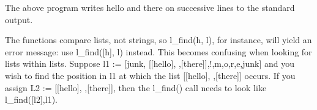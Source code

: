 
The above program writes {\textquotedbl}hello{\textquotedbl} and
{\textquotedbl}there{\textquotedbl} on successive lines to the standard
output.

The functions compare lists, not strings, so
\textsf{l\_find({\textquotedbl}h{\textquotedbl}, l)}, for instance,
will yield an error message: use
\textsf{l\_find([{\textquotedbl}h{\textquotedbl}], l)} instead. This
becomes confusing when looking for lists within lists. Suppose
\textsf{l1 := [{\textquotedbl}junk{\textquotedbl},
[[{\textquotedbl}hello{\textquotedbl}],{\textquotedbl}
{\textquotedbl},[{\textquotedbl}there{\textquotedbl}]],{\textquotedbl}!{\textquotedbl},{\textquotedbl}m{\textquotedbl},{\textquotedbl}o{\textquotedbl},{\textquotedbl}r{\textquotedbl},{\textquotedbl}e{\textquotedbl},{\textquotedbl}junk{\textquotedbl}]}
and you wish to find the position in \textsf{l1} at which the list
\textsf{[[{\textquotedbl}hello{\textquotedbl}],{\textquotedbl}
{\textquotedbl},[{\textquotedbl}there{\textquotedbl}]]} occurs. If you
assign \textsf{L2 :=
[[{\textquotedbl}hello{\textquotedbl}],{\textquotedbl}
{\textquotedbl},[{\textquotedbl}there{\textquotedbl}]]}, then the
\textsf{l\_find()} call needs to look like \textsf{l\_find([l2],l1)}.

